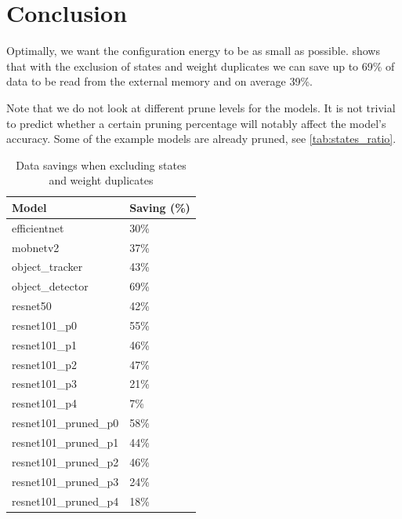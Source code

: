 \section{Conclusion}
Optimally, we want the configuration energy to be as small as possible.
 shows that with the exclusion of states and weight duplicates we can save up to 69\% of data to be read from the external memory and on average 39\%.

Note that we do not look at different prune levels for the models.
It is not trivial to predict whether a certain pruning percentage will notably affect the model's accuracy.
Some of the example models are already pruned, see \cref{tab:states_ratio}.

\begin{table}[hbtp]
\centering
\begin{tabular}{@{}ll@{}}
\toprule
\textbf{Model}          & \textbf{Saving (\%)} \\ \midrule
efficientnet            & 30\%                 \\
mobnetv2                & 37\%                 \\
object\_tracker         & 43\%                 \\
object\_detector        & 69\%                 \\
resnet50                & 42\%                 \\
resnet101\_p0           & 55\%                 \\
resnet101\_p1           & 46\%                 \\
resnet101\_p2           & 47\%                 \\
resnet101\_p3           & 21\%                 \\
resnet101\_p4           & 7\%                  \\
resnet101\_pruned\_p0   & 58\%                 \\
resnet101\_pruned\_p1   & 44\%                 \\
resnet101\_pruned\_p2   & 46\%                 \\
resnet101\_pruned\_p3   & 24\%                 \\
resnet101\_pruned\_p4   & 18\%                 \\ \bottomrule
\end{tabular}
\caption{Data savings when excluding states and weight duplicates}
\label{tab:savings}
\end{table}

